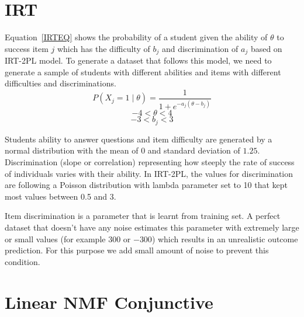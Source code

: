 \section{IRT}

Equation~\ref{IRTEQ} shows the probability of a student given the ability of $\theta$ to success item $j$ which has the difficulty of $b_j$ and discrimination of $a_j$ based on IRT-2PL model. To generate a dataset that follows this model, we need to generate a sample of students with different abilities and items with different difficulties and discriminations. 
\begin{equation}
P(X_j\!=\!1\;|\;\theta) = \frac{1}{1+e^{-a_j(\theta-b_j)}}
\label{IRTEQ}
\end{equation}
\[-4 < \theta < 4\]
\[-3 < b_j < 3\]


Students ability to answer questions and item difficulty are generated by a normal distribution with the mean of $0$ and standard deviation of $1.25$. Discrimination (slope or correlation) representing how steeply the rate of success of individuals varies with their ability. In IRT-2PL, the values for discrimination are following a Poisson distribution with lambda parameter set to 10 that kept most values between 0.5 and 3. 

Item discrimination is a parameter that is learnt from training set. A perfect dataset that doesn't have any noise estimates this parameter with extremely large or small values (for example $300$ or $-300$)  which results in an unrealistic outcome prediction. For this purpose we add small amount of noise to prevent this condition.

\section{Linear NMF Conjunctive}



